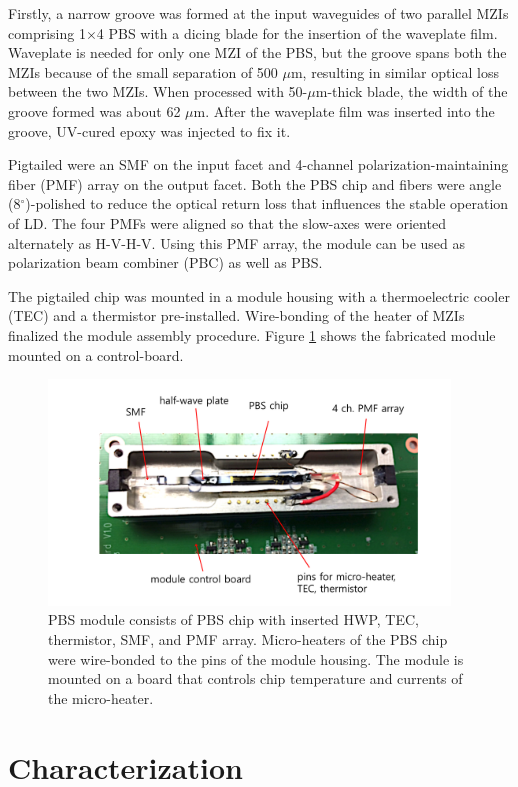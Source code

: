 \documentclass[letterpaper, 10pt]{article}
\begin{document}
Firstly, a narrow groove was formed at the input waveguides of two parallel MZIs comprising 1$\times$4 PBS with a dicing blade for the insertion of the waveplate film.
Waveplate is needed for only one MZI of the PBS, but the groove spans  both the MZIs because of the small separation of 500 $\mu$m, resulting in similar optical loss between the two MZIs.
When processed with 50-$\mu$m-thick blade, the width of the groove formed was about 62 $\mu$m.
After the waveplate film was inserted into the groove, UV-cured epoxy was injected to fix it.

Pigtailed were an SMF on the input facet and 4-channel polarization-maintaining fiber (PMF) array on the output facet.
Both the PBS chip and fibers were angle (8$^\circ$)-polished to reduce the optical return loss that influences the stable operation of LD.
The four PMFs were aligned so that the slow-axes  were oriented alternately as H-V-H-V.
Using this PMF array, the module can be used as polarization beam combiner (PBC) as well as PBS.

The pigtailed chip was mounted in a module housing with a thermoelectric cooler (TEC) and a thermistor pre-installed.
Wire-bonding of the heater of MZIs finalized the module assembly procedure.
Figure \ref{fig:module} shows the fabricated module mounted on a control-board.
\begin{figure}
  \centering
  \includegraphics[height=6cm]{module.pdf}
  \caption{PBS module consists of PBS chip with inserted HWP, TEC, thermistor, SMF, and PMF array. Micro-heaters of the PBS chip were wire-bonded to the pins of the module housing. The module is mounted on a board that controls chip temperature and currents of the micro-heater.}
  \label{fig:module}
\end{figure}

\section{Characterization}
\end{document}
